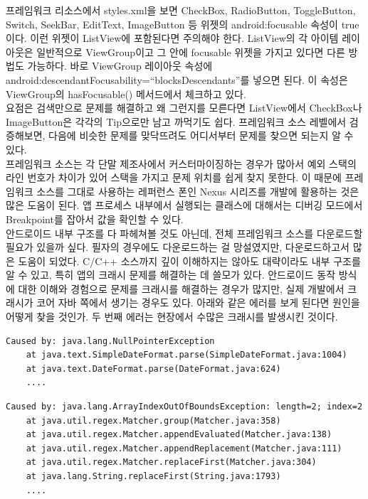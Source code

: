 프레임워크 리소스에서 styles.xml을 보면 CheckBox, RadioButton, ToggleButton, Switch, SeekBar, EditText, ImageButton 등 위젯의 android:focusable 속성이 true이다. 이런 위젯이 ListView에 포함된다면 주의해야 한다.
ListView의 각 아이템 레이아웃은 일반적으로 ViewGroup이고 그 안에 focusable 위젯을 가지고 있다면 다른 방법도 가능하다. 바로 ViewGroup 레이아웃 속성에 android:descendantFocusability=``blocksDesc\-endants''를 넣으면 된다. 이 속성은 ViewGroup의 hasFocusable() 메서드에서 체크하고 있다.\\

요점은 검색만으로 문제를 해결하고 왜 그런지를 모른다면 ListView에서 CheckBox나 ImageButton은 각각의 Tip으로만 남고 까먹기도 쉽다. 프레임워크 소스 레벨에서 검증해보면, 다음에 비슷한 문제를 맞닥뜨려도 어디서부터 문제를 찾으면 되는지 알 수 있다.\\

프레임워크 소스는 각 단말 제조사에서 커스터마이징하는 경우가 많아서 예외 스택의 라인 번호가 차이가 있어 스택을 가지고 문제 위치를 쉽게 찾지 못한다. 이 때문에 프레임워크 소스를 그대로 사용하는 레퍼런스 폰인 Nexus 시리즈를 개발에 활용하는 것은 많은 도움이 된다. 앱 프로세스 내부에서 실행되는 클래스에 대해서는 디버깅 모드에서 Breakpoint를 잡아서 값을 확인할 수 있다.\\

안드로이드 내부 구조를 다 파헤쳐볼 것도 아닌데, 전체 프레임워크 소스를 다운로드할 필요가 있을까 싶다. 필자의 경우에도 다운로드하는 걸 망설였지만, 다운로드하고서 많은 도움이 되었다. C/C++ 소스까지 깊이 이해하지는 않아도 대략이라도 내부 구조를 알 수 있고, 특히 앱의 크래시 문제를 해결하는 데 쓸모가 있다. 
안드로이드 동작 방식에 대한 이해와 경험으로 문제를 크래시를 해결하는 경우가 많지만, 실제 개발에서 크래시가 코어 자바 쪽에서 생기는 경우도 있다.
아래와 같은 에러를 보게 된다면 원인을 어떻게 찾을 것인가. 두 번째 에러는 현장에서 수많은 크래시를 발생시킨 것이다.
\begin{lstlisting}[frame=single]
Caused by: java.lang.NullPointerException
	at java.text.SimpleDateFormat.parse(SimpleDateFormat.java:1004)
	at java.text.DateFormat.parse(DateFormat.java:624)
	....
\end{lstlisting}

\begin{lstlisting}[frame=single]
Caused by: java.lang.ArrayIndexOutOfBoundsException: length=2; index=2
	at java.util.regex.Matcher.group(Matcher.java:358)
	at java.util.regex.Matcher.appendEvaluated(Matcher.java:138)
	at java.util.regex.Matcher.appendReplacement(Matcher.java:111)
	at java.util.regex.Matcher.replaceFirst(Matcher.java:304)
	at java.lang.String.replaceFirst(String.java:1793)
	....
\end{lstlisting}

